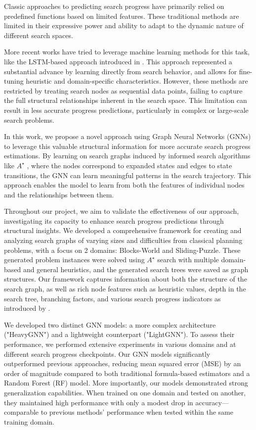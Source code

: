 \documentclass[letterpaper]{article}
\begin{document}
Classic approaches to predicting search progress have primarily relied on predefined functions based on limited features. These traditional methods are limited in their expressive power and ability to adapt to the dynamic nature of different search spaces.

More recent works have tried to leverage machine learning methods for this task, like the LSTM-based approach introduced in \citet{sudry2022learning}. This approach represented a substantial advance by learning directly from search behavior, and allows for fine-tuning heuristic and domain-specific characteristics. However, these methods are restricted by treating search nodes as sequential data points, failing to capture the full structural relationships inherent in the search space. This limitation can result in less accurate progress predictions, particularly in complex or large-scale search problems.

In this work, we propose a novel approach using Graph Neural Networks (GNNs) to leverage this valuable structural information for more accurate search progress estimations. By learning on search graphs induced by informed search algorithms like $A^{\star}$ \citep{hart1968formal}, where the nodes correspond to expanded states and edges to state transitions, the GNN can learn meaningful patterns in the search trajectory. This approach enables the model to learn from both the features of individual nodes and the relationships between them.

Throughout our project, we aim to validate the effectiveness of our approach, investigating its capacity to enhance search progress predictions through structural insights. We developed a comprehensive framework for creating and analyzing search graphs of varying sizes and difficulties from classical planning problems, with a focus on 2 domains: Blocks-World and Sliding-Puzzle. These generated problem instances were solved using $A^{\star}$ search with multiple domain-based and general heuristics, and the generated search trees were saved as graph structures. Our framework captures information about both the structure of the search graph, as well as rich node features such as heuristic values, depth in the search tree, branching factors, and various search progress indicators as introduced by \citet{sudry2022learning}.

We developed two distinct GNN models: a more complex architecture ("HeavyGNN") and a lightweight counterpart ("LightGNN"). To assess their performance, we performed extensive experiments in various domains and at different search progress checkpoints. Our GNN models significantly outperformed previous approaches, reducing mean squared error (MSE) by an order of magnitude compared to both traditional formula-based estimators and a Random Forest (RF) model. More importantly, our models demonstrated strong generalization capabilities. When trained on one domain and tested on another, they maintained high performance with only a modest drop in accuracy—comparable to previous methods' performance when tested within the same training domain.
\end{document}
